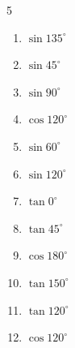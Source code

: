 \begin{multicols}{5}
\begin{enumerate}
        \phantom{$\displaystyle =0$}

  \item $\displaystyle \sin{135^\circ}$


  \item $\displaystyle \sin{45^\circ}$


  \item $\displaystyle \sin{90^\circ}$

        \phantom{$\displaystyle =1$}

  \item $\displaystyle \cos{120^\circ}$


  \item $\displaystyle \sin{60^\circ}$


  \item $\displaystyle \sin{120^\circ}$


  \item $\displaystyle \tan{0^\circ}$

        \phantom{$\displaystyle =0$}

  \item $\displaystyle \tan{45^\circ}$

        \phantom{$\displaystyle =1$}

  \item $\displaystyle \cos{180^\circ}$

        \phantom{$\displaystyle =-1$}

  \item $\displaystyle \tan{150^\circ}$


  \item $\displaystyle \tan{120^\circ}$


  \item $\displaystyle \cos{120^\circ}$


\columnbreak %


\end{enumerate}
\end{multicols}
